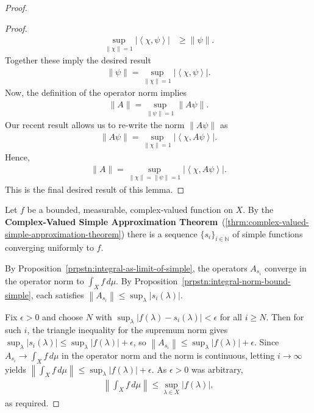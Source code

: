 \begin{proof}
\begin{proof}
\begin{align}
    \sup\limits_{\|\chi\| = 1} \lvert \left< \chi, \psi \right> \rvert &\ge \|\psi\|.
\end{align}
Together these imply the desired result
\begin{align}
    \|\psi\| = \sup\limits_{\|\chi\| = 1} \lvert \left< \chi, \psi \right> \rvert.
\end{align}
Now, the definition of the operator norm implies
\begin{align}
    \|A\| = \sup\limits_{\|\psi\| = 1} \|A\psi\|.
\end{align}
Our recent result allows us to re-write the norm $\|A\psi\|$ as
\begin{align}
    \|A\psi\| = \sup\limits_{\|\chi\| = 1} \lvert \left< \chi, A\psi \right> \rvert.
\end{align}
Hence,
\begin{align}
    \|A\| = \sup\limits_{\|\chi\| = \|\psi\| = 1} \lvert \left< \chi, A\psi \right> \rvert.
\end{align}
This is the final desired result of this lemma.
\end{proof}

Let $f$ be a bounded, measurable, complex-valued function on $X$. By the \textbf{Complex-Valued Simple Approximation Theorem}~(\ref{thrm:complex-valued-simple-approximation-theorem}) there is a sequence $\{s_i\}_{i \in \mathbb{N}}$ of simple functions converging uniformly to $f$.

By Proposition~\ref{prpstn:integral-as-limit-of-simple}, the operators $A_{s_i}$ converge in the operator norm to $\int_X f \, d\mu$. By Proposition~\ref{prpstn:integral-norm-bound-simple}, each satisfies $\left\| A_{s_i} \right\| \le \sup_\lambda \lvert s_i(\lambda) \rvert$.

Fix $\epsilon > 0$ and choose $N$ with $\sup_\lambda \lvert f(\lambda) - s_i(\lambda) \rvert < \epsilon$ for all $i \ge N$. Then for such $i$, the triangle inequality for the supremum norm gives $\sup_\lambda \lvert s_i(\lambda) \rvert \le \sup_\lambda \lvert f(\lambda) \rvert + \epsilon$, so $\left\| A_{s_i} \right\| \le \sup_\lambda \lvert f(\lambda) \rvert + \epsilon$. Since $A_{s_i} \to \int_X f \, d\mu$ in the operator norm and the norm is continuous, letting $i \to \infty$ yields $\left\| \int_X f \, d\mu \right\| \le \sup_\lambda \lvert f(\lambda) \rvert + \epsilon$. As $\epsilon > 0$ was arbitrary,
\begin{align}
    \left\| \int_X f \, d\mu \right\| \le \sup\limits_{\lambda \in X} \lvert f(\lambda) \rvert,
\end{align}
as required.
\end{proof}

